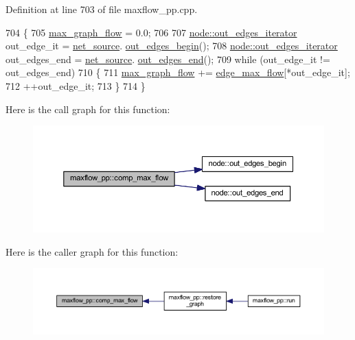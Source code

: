 Definition at line 703 of file maxflow\+\_\+pp.\+cpp.


\begin{DoxyCode}
704 \{
705     \mbox{\hyperlink{classmaxflow__pp_abdda1871e70fd2de0f2006eff57dc94e}{max\_graph\_flow}} = 0.0;
706 
707     \mbox{\hyperlink{classnode_a90e17ed34de55072e8077f4367499a98}{node::out\_edges\_iterator}} out\_edge\_it = \mbox{\hyperlink{classmaxflow__pp_a20f2d05465acc2d7b777ea8025d12003}{net\_source}}.
      \mbox{\hyperlink{classnode_a7dcb80df22118cea04f77ca8c952d9c2}{out\_edges\_begin}}();
708     \mbox{\hyperlink{classnode_a90e17ed34de55072e8077f4367499a98}{node::out\_edges\_iterator}} out\_edges\_end = \mbox{\hyperlink{classmaxflow__pp_a20f2d05465acc2d7b777ea8025d12003}{net\_source}}.
      \mbox{\hyperlink{classnode_a7ce2ba5195a63d4df6b44299a02a9378}{out\_edges\_end}}();
709     \textcolor{keywordflow}{while} (out\_edge\_it != out\_edges\_end)
710     \{
711     \mbox{\hyperlink{classmaxflow__pp_abdda1871e70fd2de0f2006eff57dc94e}{max\_graph\_flow}} += \mbox{\hyperlink{classmaxflow__pp_a25d5bb2ab6c775a634dacf408ff55a83}{edge\_max\_flow}}[*out\_edge\_it];
712     ++out\_edge\_it;
713     \}
714 \}
\end{DoxyCode}
Here is the call graph for this function\+:\nopagebreak
\begin{figure}[H]
\begin{center}
\leavevmode
\includegraphics[width=350pt]{classmaxflow__pp_a6a8a301739757493318b1abfbed2698b_cgraph}
\end{center}
\end{figure}
Here is the caller graph for this function\+:\nopagebreak
\begin{figure}[H]
\begin{center}
\leavevmode
\includegraphics[width=350pt]{classmaxflow__pp_a6a8a301739757493318b1abfbed2698b_icgraph}
\end{center}
\end{figure}
\mbox{\label{classmaxflow__pp_ab1146e40ae2f2405e0ca6ea3ff43a6ff}} 

